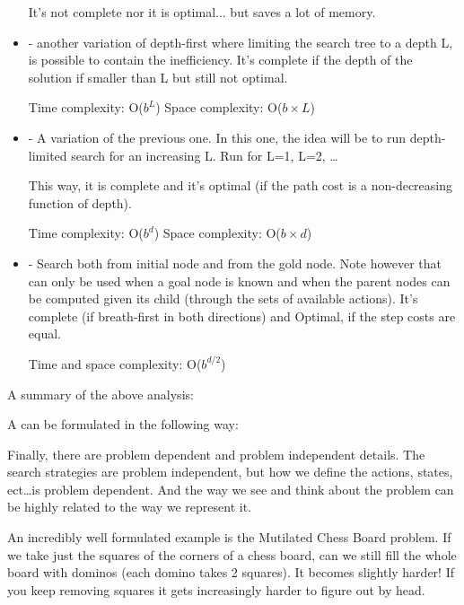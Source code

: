 \begin{itemize}
    It's not complete nor it is optimal... but saves a lot of memory.

    \item {} - another variation of depth-first where limiting the search tree to a depth L, is possible to contain the inefficiency. It's complete if the depth of the solution if smaller than L but still not optimal. 
    
    Time complexity: O($b^L$)
    Space complexity: O($b \times L$)

    \item {} - A variation of the previous one. In this one, the idea will be to run depth-limited search for an increasing L. Run for L=1, L=2, \dots
    
    This way, it is complete and it's optimal (if the path cost is a non-decreasing function of depth).

    Time complexity: O($b^d$)
    Space complexity: O($b \times d$)



    \item {} - Search both from initial node and from the gold node. Note however that can only be used when a goal node is known and when the parent nodes can be computed given its child (through the sets of available actions). It's complete (if breath-first in both directions) and Optimal, if the step costs are equal.
    
    Time and space complexity: O($b^{d/2}$)

\end{itemize}


A summary of the above analysis:
    

A  can be formulated in the following way:




Finally, there are problem dependent and problem independent details. The search strategies are problem independent, but how we define the actions, states, ect\dots is problem dependent. And the way we see and think about the problem can be highly related to the way we represent it. 

An incredibly well formulated example is the Mutilated Chess Board problem. If we take just the squares of the corners of a chess board, can we still fill the whole board with dominos (each domino takes 2 squares). It becomes slightly harder! If you keep removing squares it gets increasingly harder to figure out by head. 


